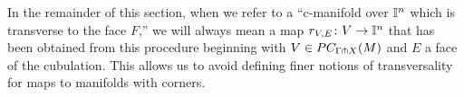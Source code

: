 In the remainder of this section, when we refer to a ``c-manifold over $\mathbb{I}^n$ which is transverse to the face $F$,'' we will always mean a map $r_{V,E} \colon V \to \mathbb{I}^n$ that has been obtained from this procedure beginning with $V \in PC_{\Gamma \pitchfork X}(M)$ and $E$ a face of the cubulation.
This allows us to avoid defining finer notions of transversality for maps to manifolds with corners.


\begin{comment}
	Included in the following definition and lemma is a justification for referring to such an object as transverse to the faces of $\interval^n$.



	\begin{definition}
		Let $F$ be a face of $\interval^n \subset \R^n$ and $U$ a c-manifold over $\interval^n$.
		We say $r_U$ is
		{\bf complementary} to $F$ at some $x$ in its image if it is transverse to the parallel translate of $F$ to $x$.
	\end{definition}



	\begin{lemma}\label{L:complement}
		Suppose $E$ is an $n$-dimensional cube in a cubulation of the manifold without boundary $M$ and that $V \in PC^*_{\Gamma \pf}(M)$.
		Let $F$ be a face of $E$.
		Then there is an open neighborhood $B$ of $F$ in $E$ such that $r_{V,E}$ is complementary to $F$ at every $x \in (r_{V,E})^{-1}(B)$.
	\end{lemma}


	\begin{proof}[Proof of Lemma~\ref{L:complement}]
		If $\dim(V) + \dim(F) < \dim(M)$ then, by transversality, $r_V$ is disjoint from $F$.
		So by \cref{L:proper nbhd} there is a neighborhood of $F$ in $M$, and hence a neighborhood of $F$ in $E$, that is disjoint from the image of $V$.

		Next suppose $\dim(V) + \dim(F) \geq \dim(M)$.
		Behavior of $V_E$ near the boundary of $E$, where we need to argue, could be delicate due to the corners introduced.
		But given $x \in V$ with $z = r_V(x) \in F$, we apply Lemma~\ref{L:charextension} to obtain a neighborhood $H$ of $z$ in
		$\R^n$ and an embedding $i_H \colon H \to M$ that agrees with $i_E$ on $H \cap E$.
		Thus the pull-back $V_H = V \times_M H \to H$ is a codimension zero open submanifold of $V$ which agrees with $V \times_E E \to E$ over $E \cap H$.

		The benefit of working with $V_H$ is that since $H$ does not have boundary, $V_H$ is stratified by the $S^k(V) \times_M H$, which we denote $V_H^k$.
		As we did for $E$, we will identify $H$ with its image in $M$, and so also identify $z$ with $z'$.
		Let us also write $r_{V,H}$ for the pull-back map $V_H \to H$ and $r_{V,H}^k$ for the restriction of $r_{V,H}$ to $V_H^k$.


\end{comment}
